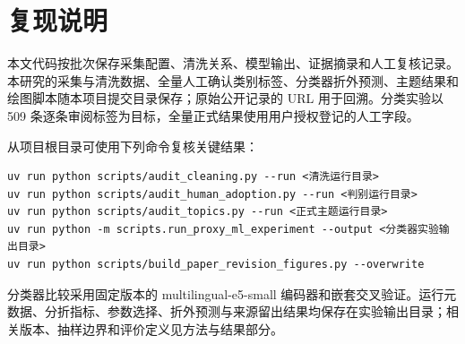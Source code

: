 \section{复现说明}

本文代码按批次保存采集配置、清洗关系、模型输出、证据摘录和人工复核记录。本研究的采集与清洗数据、全量人工确认类别标签、分类器折外预测、主题结果和绘图脚本随本项目提交目录保存；原始公开记录的 URL 用于回溯。分类实验以 509 条逐条审阅标签为目标，全量正式结果使用用户授权登记的人工字段。

从项目根目录可使用下列命令复核关键结果：

\begin{lstlisting}
uv run python scripts/audit_cleaning.py --run <清洗运行目录>
uv run python scripts/audit_human_adoption.py --run <判别运行目录>
uv run python scripts/audit_topics.py --run <正式主题运行目录>
uv run python -m scripts.run_proxy_ml_experiment --output <分类器实验输出目录>
uv run python scripts/build_paper_revision_figures.py --overwrite
\end{lstlisting}

分类器比较采用固定版本的 multilingual-e5-small 编码器和嵌套交叉验证。运行元数据、分折指标、参数选择、折外预测与来源留出结果均保存在实验输出目录；相关版本、抽样边界和评价定义见方法与结果部分。
